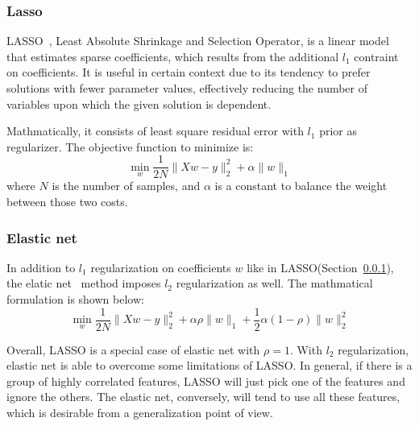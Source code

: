 \subsubsection{Lasso}
\label{ssub:lasso}
LASSO~\cite{Tibshirani1996}, Least Absolute Shrinkage and Selection Operator, is a linear model that estimates sparse coefficients, which results from the additional $l_1$ contraint on coefficients.
It is useful in certain context due to its tendency to prefer solutions with fewer parameter values, effectively reducing the number of variables upon which the given solution is dependent.

Mathmatically, it consists of least square residual error with $l_1$ prior as regularizer.
The objective function to minimize is:
\begin{equation}
  \min_w\frac{1}{2N}\|Xw - y\|^2_2 + \alpha\|w\|_1
\end{equation}
where $N$ is the number of samples, and $\alpha$ is a constant to balance the weight between those two costs.

\subsubsection{Elastic net}
\label{ssub:elastic_net}
In addition to $l_1$ regularization on coefficients $w$ like in LASSO(Section~\ref{ssub:lasso}), the elatic net~\cite{zou2005} method imposes $l_2$ regularization as well.
The mathmatical formulation is shown below:
\begin{equation}
  \min_w\frac{1}{2N}\|Xw - y\|^2_2 + \alpha\rho\|w\|_1 + \frac{1}{2}\alpha(1-\rho)\|w\|^2_2
\end{equation}

Overall, LASSO is a special case of elastic net with $\rho = 1$.
With $l_2$ regularization, elastic net is able to overcome some limitations of LASSO\@.
In general, if there is a group of highly correlated features, LASSO will just pick one of the features and ignore the others.
The elastic net, conversely, will tend to use all these features, which is desirable from a generalization point of view.

